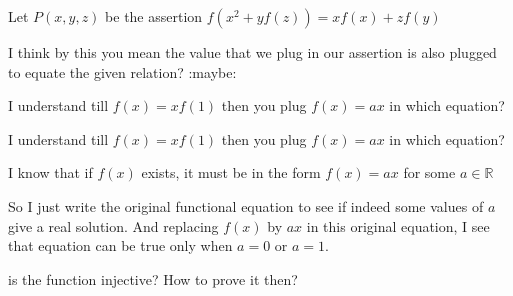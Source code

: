 \begin{solution}
	\begin{tcolorbox}
Let $P(x,y,z)$ be the assertion $f(x^2+yf(z))=xf(x)+zf(y)$

\end{tcolorbox}
I think by this you mean the value that we plug in our assertion is also plugged to equate the given relation? :maybe:
\end{solution}






\begin{solution}
	I understand till $f(x)=xf(1)$
then you plug $f(x)=ax$ in which equation?
\end{solution}



\begin{solution}
	\begin{tcolorbox}I understand till $f(x)=xf(1)$
then you plug $f(x)=ax$ in which equation?\end{tcolorbox}
I know that if $f(x)$ exists, it must be in the form $f(x)=ax$ for some $a\in\mathbb R$

So I just write the original functional equation to see if indeed some values of $a$ give a real solution. And replacing $f(x)$ by $ax$ in this original equation, I see that equation can be true only when $a=0$ or $a=1$.
\end{solution}



\begin{solution}
	is the function injective?
How to prove it then?
\end{solution}




